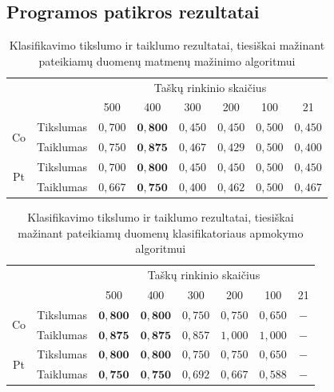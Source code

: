 \documentclass[]{vgtuef}
\begin{document}
\subsection{Programos patikros rezultatai}
\begin{table}
	\centering
	\renewcommand{\arraystretch}{1.3}
	\caption{Klasifikavimo tikslumo ir taiklumo rezultatai, tiesiškai mažinant pateikiamų duomenų matmenų mažinimo algoritmui}
	\label{table:first_phase_experiment}
	\begin{tabular}{|c|c|c|c|c|c|c|c|} \hline
			& & \multicolumn{6}{c|}{Taškų rinkinio skaičius} \\ \cline{3-8}
						&	& 500 	& 400	& 300 	& 200 & 100 	& 21 	\\ \hline
		\multirow{2}{*}{Co}
		& Tikslumas	& $0,700$ & $\mathbf{0,800}$ & $0,450$ & $0,450$ & $0,500$ & $0,450$ \\ \cline{2-8}
		& Taiklumas  &	$0,750$ & $\mathbf{0,875}$ & $0,467$ & $0,429$ & $0,500$ & $0,400$ \\ \hline
		\multirow{2}{*}{Pt}
		& Tikslumas	& $0,700$ & $\mathbf{0,800}$ & $0,450$ & $0,450$ & $0,500$ & $0,450$ \\ \cline{2-8}
		& Taiklumas  &	$0,667$ & $\mathbf{0,750}$ & $0,400$ & $0,462$ & $0,500$ & $0,467$ \\ \hline
	\end{tabular}
\end{table}

\begin{table}
	\centering
	\renewcommand{\arraystretch}{1.3}
	\caption{Klasifikavimo tikslumo ir taiklumo rezultatai, tiesiškai mažinant pateikiamų duomenų klasifikatoriaus apmokymo algoritmui}
	\label{table:second_phase_experiment}
	\begin{tabular}{|c|c|c|c|c|c|c|c|} \hline
			& & \multicolumn{6}{c|}{Taškų rinkinio skaičius} \\ \cline{3-8}
						&	& 500 	& 400	& 300 	& 200 & 100 	& 21 	\\ \hline
		\multirow{2}{*}{Co}
		& Tikslumas	& $\mathbf{0,800}$ & $\mathbf{0,800}$ & $0,750$ & $0,750$ & $0,650$ & $-$ \\ \cline{2-8}
		& Taiklumas  &	$\mathbf{0,875}$ & $\mathbf{0,875}$ & $0,857$ & $1,000$ & $1,000$ & $-$ \\ \hline
		\multirow{2}{*}{Pt}
		& Tikslumas	& $\mathbf{0,800}$ & $\mathbf{0,800}$ & $0,750$ & $0,750$ & $0,650$ & $-$ \\ \cline{2-8}
		& Taiklumas  &	$\mathbf{0,750}$ & $\mathbf{0,750}$ & $0,692$ & $0,667$ & $0,588$ & $-$ \\ \hline
	\end{tabular}
\end{table}
\end{document}
